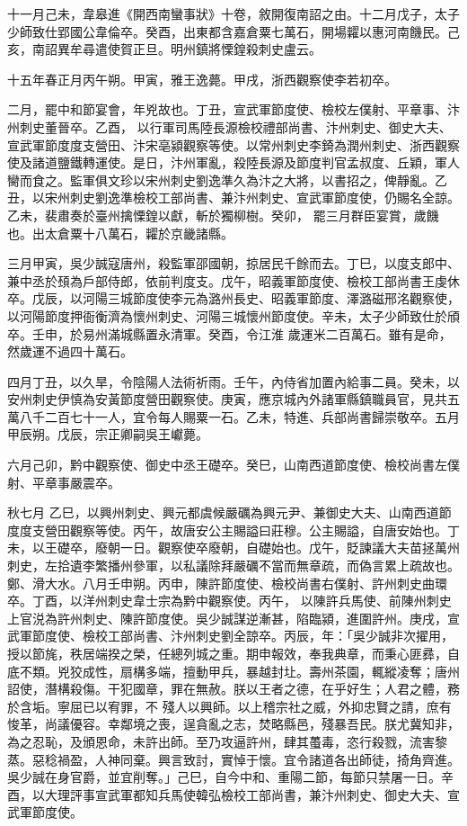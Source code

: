 \begin{pinyinscope}
 十一月己未，韋皋進《開西南蠻事狀》十卷，敘開復南詔之由。十二月戊子，太子少師致仕郢國公韋倫卒。癸酉，出東都含嘉倉粟七萬石，開場糶以惠河南饑民。己亥，南詔異牟尋遣使賀正旦。明州鎮將慄鍠殺刺史盧云。



 十五年春正月丙午朔。甲寅，雅王逸薨。甲戌，浙西觀察使李若初卒。



 二月，罷中和節宴會，年兇故也。丁丑，宣武軍節度使、檢校左僕射、平章事、汴州刺史董晉卒。乙酉，
 以行軍司馬陸長源檢校禮部尚書、汴州刺史、御史大夫、宣武軍節度度支營田、汴宋亳潁觀察等使。以常州刺史李錡為潤州刺史、浙西觀察使及諸道鹽鐵轉運使。是日，汴州軍亂，殺陸長源及節度判官孟叔度、丘穎，軍人臠而食之。監軍俱文珍以宋州刺史劉逸準久為汴之大將，以書招之，俾靜亂。乙丑，以宋州刺史劉逸準檢校工部尚書、兼汴州刺史、宣武軍節度使，仍賜名全諒。乙未，裴肅奏於臺州擒慄鍠以獻，斬於獨柳樹。癸卯，
 罷三月群臣宴賞，歲饑也。出太倉粟十八萬石，糶於京畿諸縣。



 三月甲寅，吳少誠寇唐州，殺監軍邵國朝，掠居民千餘而去。丁巳，以度支郎中、兼中丞於䪹為戶部侍郎，依前判度支。戊午，昭義軍節度使、檢校工部尚書王虔休卒。戊辰，以河陽三城節度使李元為潞州長史、昭義軍節度、澤潞磁邢洺觀察使，以河陽節度押衙衡濟為懷州刺史、河陽三城懷州節度使。辛未，太子少師致仕於頎卒。壬申，於易州滿城縣置永清軍。癸酉，令江淮
 歲運米二百萬石。雖有是命，然歲運不過四十萬石。



 四月丁丑，以久旱，令陰陽人法術祈雨。壬午，內侍省加置內給事二員。癸未，以安州刺史伊慎為安黃節度營田觀察使。庚寅，應京城內外諸軍縣鎮職員官，見共五萬八千二百七十一人，宜令每人賜粟一石。乙未，特進、兵部尚書歸崇敬卒。五月甲辰朔。戊辰，宗正卿嗣吳王巘薨。



 六月己卯，黔中觀察使、御史中丞王礎卒。癸巳，山南西道節度使、檢校尚書左僕射、平章事嚴震卒。



 秋七月
 乙巳，以興州刺史、興元都虞候嚴礪為興元尹、兼御史大夫、山南西道節度度支營田觀察等使。丙午，故唐安公主賜謚曰莊穆。公主賜謚，自唐安始也。丁未，以王礎卒，廢朝一日。觀察使卒廢朝，自礎始也。戊午，貶諫議大夫苗拯萬州刺史，左拾遺李繁播州參軍，以私議除拜嚴礪不當而無章疏，而偽言累上疏故也。鄭、滑大水。八月壬申朔。丙申，陳許節度使、檢校尚書右僕射、許州刺史曲環卒。丁酉，以洋州刺史韋士宗為黔中觀察使。丙午，
 以陳許兵馬使、前陳州刺史上官涚為許州刺史、陳許節度使。吳少誠謀逆漸甚，陷臨潁，進圍許州。庚戌，宣武軍節度使、檢校工部尚書、汴州刺史劉全諒卒。丙辰，年：「吳少誠非次擢用，授以節旄，秩居端揆之榮，任總列城之重。期申報效，奉我典章，而秉心匪彞，自底不類。兇狡成性，扇構多端，擅動甲兵，暴越封圵。壽州茶園，輒縱凌奪；唐州詔使，潛構殺傷。干犯國章，罪在無赦。朕以王者之德，在乎好生；人君之體，務於含垢。寧屈已以宥罪，不
 殘人以興師。以上稽宗社之威，外抑忠賢之請，庶有悛革，尚議優容。幸鄰境之喪，逞貪亂之志，焚略縣邑，殘暴吾民。朕尤冀知非，為之忍恥，及頒恩命，未許出師。至乃攻逼許州，肆其蠆毒，恣行殺戮，流害黎蒸。惡稔禍盈，人神同棄。興言致討，實悼于懷。宜令諸道各出師徒，掎角齊進。吳少誠在身官爵，並宜削奪。」己巳，自今中和、重陽二節，每節只禁屠一日。辛酉，以大理評事宣武軍都知兵馬使韓弘檢校工部尚書，兼汴州刺史、御史大夫、宣
 武軍節度使。




\end{pinyinscope}
